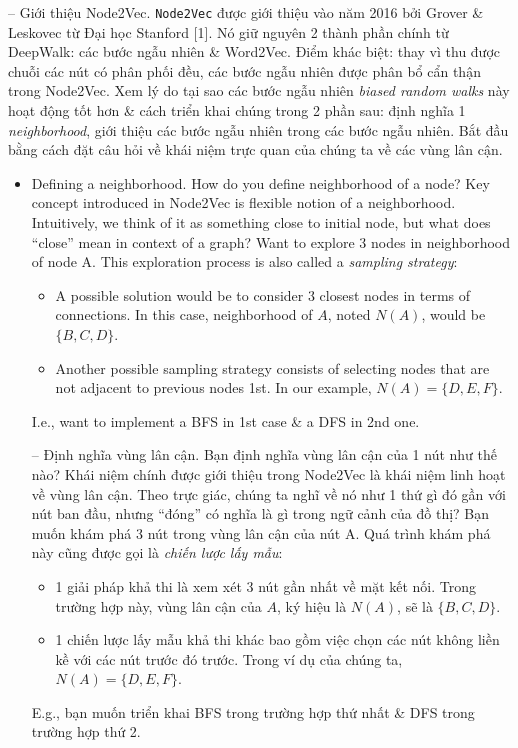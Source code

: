 \documentclass{article}
\begin{document}
\begin{itemize}
\begin{itemize}
        -- {\sf Giới thiệu Node2Vec.} {\tt Node2Vec} được giới thiệu vào năm 2016 bởi {\sc Grover \& Leskovec} từ Đại học Stanford [1]. Nó giữ nguyên 2 thành phần chính từ DeepWalk: các bước ngẫu nhiên \& Word2Vec. Điểm khác biệt: thay vì thu được chuỗi các nút có phân phối đều, các bước ngẫu nhiên được phân bổ cẩn thận trong Node2Vec. Xem lý do tại sao các bước ngẫu nhiên {\it biased random walks} này hoạt động tốt hơn \& cách triển khai chúng trong 2 phần sau: định nghĩa 1 {\it neighborhood}, giới thiệu các bước ngẫu nhiên trong các bước ngẫu nhiên. Bắt đầu bằng cách đặt câu hỏi về khái niệm trực quan của chúng ta về các vùng lân cận.
        \begin{itemize}
            \item {\sf Defining a neighborhood.} How do you define neighborhood of a node? Key concept introduced in Node2Vec is flexible notion of a neighborhood. Intuitively, we think of it as something close to initial node, but what does ``close'' mean in context of a graph? Want to explore 3 nodes in neighborhood of node A. This exploration process is also called a {\it sampling strategy}:
            \begin{itemize}
                \item A possible solution would be to consider 3 closest nodes in terms of connections. In this case, neighborhood of $A$, noted $N(A)$, would be $\{B,C,D\}$.
                \item Another possible sampling strategy consists of selecting nodes that are not adjacent to previous nodes 1st. In our example, $N(A) = \{D,E,F\}$.
            \end{itemize}
            I.e., want to implement a BFS in 1st case \& a DFS in 2nd one.

            -- {\sf Định nghĩa vùng lân cận.} Bạn định nghĩa vùng lân cận của 1 nút như thế nào? Khái niệm chính được giới thiệu trong Node2Vec là khái niệm linh hoạt về vùng lân cận. Theo trực giác, chúng ta nghĩ về nó như 1 thứ gì đó gần với nút ban đầu, nhưng ``đóng'' có nghĩa là gì trong ngữ cảnh của đồ thị? Bạn muốn khám phá 3 nút trong vùng lân cận của nút A. Quá trình khám phá này cũng được gọi là {\it chiến lược lấy mẫu}:
            \begin{itemize}
                \item 1 giải pháp khả thi là xem xét 3 nút gần nhất về mặt kết nối. Trong trường hợp này, vùng lân cận của $A$, ký hiệu là $N(A)$, sẽ là $\{B,C,D\}$.
                \item 1 chiến lược lấy mẫu khả thi khác bao gồm việc chọn các nút không liền kề với các nút trước đó trước. Trong ví dụ của chúng ta, $N(A) = \{D,E,F\}$.
            \end{itemize}
            E.g., bạn muốn triển khai BFS trong trường hợp thứ nhất \& DFS trong trường hợp thứ 2.


\end{itemize}
\end{itemize}
\end{itemize}
\end{document}
